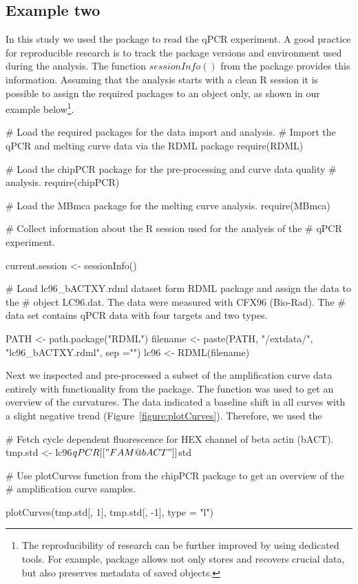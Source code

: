 \subsection{Example two}
In this study we used the  package to read the qPCR experiment. A 
good practice for reproducible research is to track the package versions and 
environment used during the analysis. The function $sessionInfo()$ from the 
 package provides this information. Assuming that the analysis 
starts with a clean R session it is possible to assign the required packages to 
an object only, as shown in our example below\footnote{The reproducibility of 
research can be further improved by using dedicated tools. For example, 
 package allows not only stores and recovers crucial data, 
but also preserves metadata of saved objects.}.

\begin{example}
# Load the required packages for the data import and analysis.
# Import the qPCR and melting curve data via the RDML package
require(RDML)

# Load the chipPCR package for the pre-processing and curve data quality
# analysis.
require(chipPCR)

# Load the MBmca package for the melting curve analysis.
require(MBmca)

# Collect information about the R session used for the analysis of the
# qPCR experiment.

current.session <- sessionInfo()

# Load lc96_bACTXY.rdml dataset form RDML package and assign the data to the 
# object LC96.dat. The data were measured with CFX96 (Bio-Rad). The 
# data set contains qPCR data with four targets and two types.

PATH <- path.package("RDML")
filename <- paste(PATH, "/extdata/", "lc96_bACTXY.rdml", sep ="")
lc96 <- RDML(filename)
\end{example}

Next we inspected and pre-processed a subset of the amplification curve data 
entirely with functionality from the  package. The 
 function was used to get an overview of the curvatures. The 
data indicated a baseline shift in all curves with a slight negative trend 
(Figure~\ref{figure:plotCurves}). Therefore, we used the 

\begin{example}
# Fetch cycle dependent fluorescence for HEX channel of beta actin (bACT).
tmp.std <- lc96$qPCR[["FAM@bACT"]]$std


# Use plotCurves function from the chipPCR package to get an overview of the 
# amplification curve samples.

plotCurves(tmp.std[, 1], tmp.std[, -1], type = "l")

\end{example}


